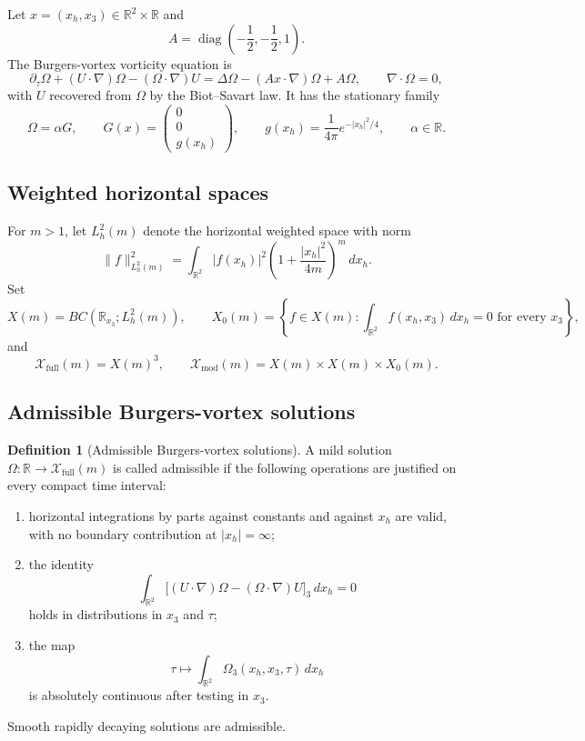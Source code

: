\documentclass[11pt]{amsart}
\theoremstyle{plain}
\theoremstyle{definition}
\newtheorem{definition}[theorem]{Definition}
\theoremstyle{remark}
\numberwithin{equation}{section}
\begin{document}
Let \(x=(x_h,x_3)\in\mathbb R^2\times\mathbb R\) and
\[
   A=\operatorname{diag}\left(-\frac12,-\frac12,1\right).
\]
The Burgers-vortex vorticity equation is
\begin{equation}\label{eq:burgers}
   \partial_\tau\Omega+(U\cdot\nabla)\Omega-(\Omega\cdot\nabla)U
   =
   \Delta\Omega-(Ax\cdot\nabla)\Omega+A\Omega,
   \qquad
   \nabla\cdot\Omega=0,
\end{equation}
with \(U\) recovered from \(\Omega\) by the Biot--Savart law.  It has the
stationary family
\begin{equation}\label{eq:burgers-family}
   \Omega=\alpha G,\qquad
   G(x)=\begin{pmatrix}0\\0\\g(x_h)\end{pmatrix},
   \qquad
   g(x_h)=\frac1{4\pi}e^{-|x_h|^2/4},
   \qquad \alpha\in\mathbb R .
\end{equation}

\subsection{Weighted horizontal spaces}

For \(m>1\), let \(L^2_h(m)\) denote the horizontal weighted space with norm
\[
   \|f\|_{L^2_h(m)}^2
   =
   \int_{\mathbb R^2}|f(x_h)|^2
   \left(1+\frac{|x_h|^2}{4m}\right)^m\,dx_h .
\]
Set
\[
   X(m)=BC(\mathbb R_{x_3};L^2_h(m)),\qquad
   X_0(m)=
   \left\{
      f\in X(m):
      \int_{\mathbb R^2}f(x_h,x_3)\,dx_h=0
      \text{ for every }x_3
   \right\},
\]
and
\[
   \mathcal X_{\mathrm{full}}(m)=X(m)^3,\qquad
   \mathcal X_{\mathrm{mod}}(m)=X(m)\times X(m)\times X_0(m).
\]

\subsection{Admissible Burgers-vortex solutions}

\begin{definition}[Admissible Burgers-vortex solutions]\label{def:admissible-bv}
A mild solution
\(\Omega:\mathbb R\to\mathcal X_{\mathrm{full}}(m)\) is called admissible if
the following operations are justified on every compact time interval:
\begin{enumerate}[label=\textup{(\roman*)}]
\item horizontal integrations by parts against constants and against \(x_h\)
are valid, with no boundary contribution at \(|x_h|=\infty\);
\item the identity
\[
   \int_{\mathbb R^2}
   \bigl[(U\cdot\nabla)\Omega-(\Omega\cdot\nabla)U\bigr]_3\,dx_h=0
\]
holds in distributions in \(x_3\) and \(\tau\);
\item the map
\[
   \tau\mapsto
   \int_{\mathbb R^2}\Omega_3(x_h,x_3,\tau)\,dx_h
\]
is absolutely continuous after testing in \(x_3\).
\end{enumerate}
Smooth rapidly decaying solutions are admissible.
\end{definition}
\end{document}
